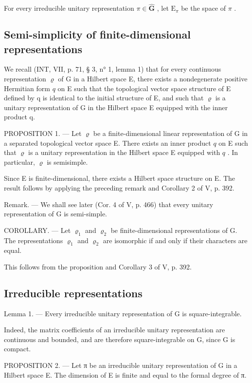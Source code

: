 For every irreducible unitary representation \(\pi \in \widehat{\mathbf{G}}\) , let \(\mathrm{E}_{\pi}\) be the space of \(\pi\) .

\subsection{Semi-simplicity of finite-dimensional representations}

We recall (INT, VII, p. 71, § 3, n° 1, lemma 1) that for every continuous representation \(\varrho\) of G in a Hilbert space E, there exists a nondegenerate positive Hermitian form \(q\) on E such that the topological vector space structure of E defined by q is identical to the initial structure of E, and such that \(\varrho\) is a unitary representation of G in the Hilbert space E equipped with the inner product q.

PROPOSITION 1. --- Let \(\varrho\) be a finite-dimensional linear representation of G in a separated topological vector space E. There exists an inner product \(q\) on E such that \(\varrho\) is a unitary representation in the Hilbert space E equipped with \(q\) . In particular, \(\varrho\) is semisimple.

Since E is finite-dimensional, there exists a Hilbert space structure on E. The result follows by applying the preceding remark and Corollary 2 of V, p. 392.

Remark. --- We shall see later (Cor. 4 of V, p. 466) that every unitary representation of G is semi-simple.

COROLLARY. --- Let \(\varrho_{1}\) and \(\varrho_{2}\) be finite-dimensional representations of G. The representations \(\varrho_{1}\) and \(\varrho_{2}\) are isomorphic if and only if their characters are equal.

This follows from the proposition and Corollary 3 of V, p. 392.

\subsection{Irreducible representations}

Lemma 1. --- Every irreducible unitary representation of G is square-integrable.

Indeed, the matrix coefficients of an irreducible unitary representation are continuous and bounded, and are therefore square-integrable on G, since G is compact.

PROPOSITION 2. --- Let π be an irreducible unitary representation of G in a Hilbert space E. The dimension of E is finite and equal to the formal degree of π.

